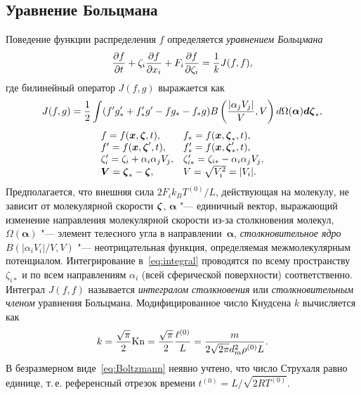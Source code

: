 \subsection{Уравнение Больцмана}

Поведение функции распределения \(f\) определяется \emph{уравнением Больцмана}
\begin{equation}\label{eq:Boltzmann}
    \pder[f]{t} + \zeta_i\pder[f]{x_i} + F_i\pder[f]{\zeta_i} = \frac1k J(f,f),
\end{equation}
где билинейный оператор \(J(f,g)\) выражается как
\begin{equation}\label{eq:integral}
    J(f,g) = \frac12 \int(f'g'_*+f'_*g'-fg_*-f_*g) B\left(\frac{|\alpha_j V_j|}{V},V\right)
        \dd\Omega(\boldsymbol\alpha)\dzeta_*,
\end{equation}
\begin{equation*}
    \begin{array}{l l}
        f = f(\bx,\bzeta,t), & f_* = f(\bx,\bzeta_*,t), \\
        f' = f(\bx,\bzeta',t), & f'_* = f(\bx,\bzeta'_*,t), \\
        \zeta_i' = \zeta_i+\alpha_i\alpha_j V_j, & \zeta_{i*}' = \zeta_{i*}-\alpha_i\alpha_j V_j, \\
        \boldsymbol{V} = \bzeta_*-\bzeta, & V = \sqrt{V_i^2} = |V_i|.
    \end{array}
\end{equation*}
Предполагается, что внешняя сила \(2F_i k_B T^{(0)}/L\), действующая на молекулу,
не зависит от молекулярной скорости \(\bzeta\),
\(\boldsymbol\alpha\) "--- единичный вектор,
выражающий изменение направления молекулярной скорости из-за столкновения молекул,
\(\Omega(\boldsymbol\alpha)\) "--- элемент телесного угла в направлении~\(\boldsymbol\alpha\),
\emph{столкновительное ядро} \(B(|\alpha_i V_i|/V,V)\) "--- неотрицательная функция,
определяемая межмолекулярным потенциалом.
Интегрирование в~\eqref{eq:integral} проводятся по всему пространству \(\zeta_{i*}\) и
по всем направлениям \(\alpha_i\) (всей сферической поверхности) соответственно.
Интеграл \(J(f,f)\) называется \emph{интегралом столкновения}
или \emph{столкновительным членом} уравнения Больцмана.
Модифицированное число Кнудсена \(k\) вычисляется как
\begin{equation}\label{eq:modified_kn}
    k = \frac{\sqrt\pi}2\Kn = \frac{\sqrt\pi}2 \frac{\ell^{(0)}}L = \frac{m}{2\sqrt{2\pi} d_m^2 \rho^{(0)}L}.
\end{equation}
В безразмерном виде~\eqref{eq:Boltzmann} неявно учтено, что число Струхаля равно единице,
т.\,е. референсный отрезок времени \(t^{(0)} = L/\sqrt{2RT^{(0)}}\).

